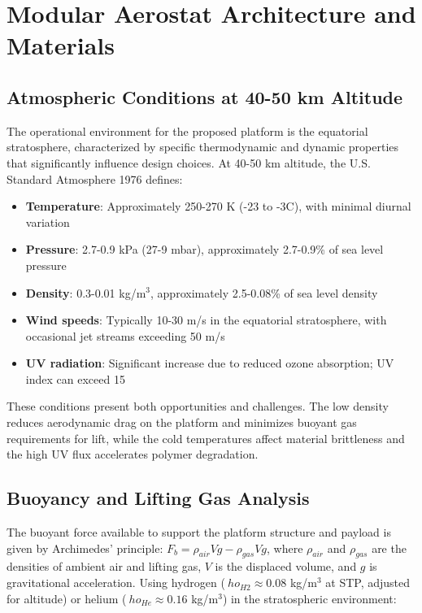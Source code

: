 \section{Modular Aerostat Architecture and Materials}
\label{sec:aerostat}

\subsection{Atmospheric Conditions at 40-50 km Altitude}
The operational environment for the proposed platform is the equatorial stratosphere, characterized by specific thermodynamic and dynamic properties that significantly influence design choices. At 40-50 km altitude, the U.S. Standard Atmosphere 1976 \cite{ussa1976} defines:
\begin{itemize}
    \item \textbf{Temperature}: Approximately 250-270 K (-23 to -3\textdegree{}C), with minimal diurnal variation
    \item \textbf{Pressure}: 2.7-0.9 kPa (27-9 mbar), approximately 2.7-0.9\% of sea level pressure
    \item \textbf{Density}: 0.3-0.01 kg/m$^3$, approximately 2.5-0.08\% of sea level density
    \item \textbf{Wind speeds}: Typically 10-30 m/s in the equatorial stratosphere, with occasional jet streams exceeding 50 m/s \cite{holton2004}
    \item \textbf{UV radiation}: Significant increase due to reduced ozone absorption; UV index can exceed 15 \cite{blumthaler1997}
\end{itemize}
These conditions present both opportunities and challenges. The low density reduces aerodynamic drag on the platform and minimizes buoyant gas requirements for lift, while the cold temperatures affect material brittleness and the high UV flux accelerates polymer degradation.

\subsection{Buoyancy and Lifting Gas Analysis}
The buoyant force available to support the platform structure and payload is given by Archimedes' principle: $F_b = \rho_{air} V g - \rho_{gas} V g$, where $\rho_{air}$ and $\rho_{gas}$ are the densities of ambient air and lifting gas, $V$ is the displaced volume, and $g$ is gravitational acceleration. Using hydrogen ($\
ho_{H2} \approx 0.08$ kg/m$^3$ at STP, adjusted for altitude) or helium ($\
ho_{He} \approx 0.16$ kg/m$^3$) in the stratospheric environment:

